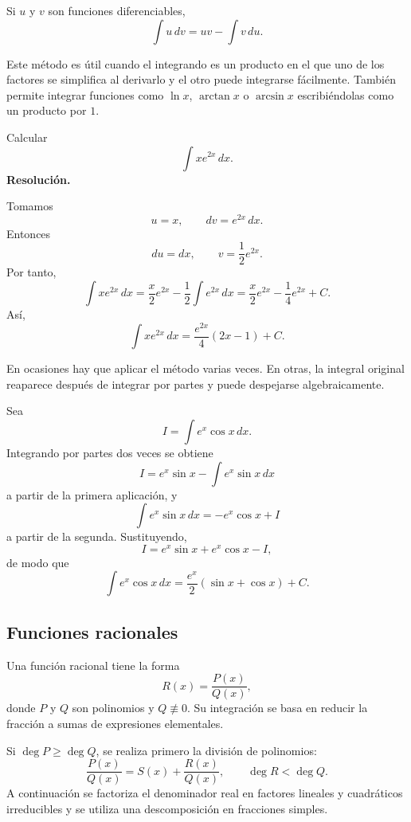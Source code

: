 \begin{theorem}
Si $u$ y $v$ son funciones diferenciables,
\[
\boxed{\int u\,dv=uv-\int v\,du.}
\]
\end{theorem}

Este método es útil cuando el integrando es un producto en el que uno de los factores se simplifica al derivarlo y el otro puede integrarse fácilmente. También permite integrar funciones como $\ln x$, $\arctan x$ o $\arcsin x$ escribiéndolas como un producto por $1$.

\begin{solvedexercise}
Calcular
\[
\int x e^{2x}\,dx.
\]
\tcblower
\textbf{Resolución.}\par\smallskip
Tomamos
\[
u=x,
\qquad dv=e^{2x}\,dx.
\]
Entonces
\[
du=dx,
\qquad v=\frac12e^{2x}.
\]
Por tanto,
\[
\int xe^{2x}\,dx
=
\frac{x}{2}e^{2x}-\frac12\int e^{2x}\,dx
=
\frac{x}{2}e^{2x}-\frac14e^{2x}+C.
\]
Así,
\[
\boxed{\int xe^{2x}\,dx=\frac{e^{2x}}4(2x-1)+C.}
\]
\end{solvedexercise}

En ocasiones hay que aplicar el método varias veces. En otras, la integral original reaparece después de integrar por partes y puede despejarse algebraicamente.

\begin{example}
Sea
\[
I=\int e^x\cos x\,dx.
\]
Integrando por partes dos veces se obtiene
\[
I=e^x\sin x-\int e^x\sin x\,dx
\]
a partir de la primera aplicación, y
\[
\int e^x\sin x\,dx=-e^x\cos x+I
\]
a partir de la segunda. Sustituyendo,
\[
I=e^x\sin x+e^x\cos x-I,
\]
de modo que
\[
\boxed{\int e^x\cos x\,dx=\frac{e^x}{2}(\sin x+\cos x)+C.}
\]
\end{example}

\subsection{Funciones racionales}

Una función racional tiene la forma
\[
R(x)=\frac{P(x)}{Q(x)},
\]
donde $P$ y $Q$ son polinomios y $Q\not\equiv0$. Su integración se basa en reducir la fracción a sumas de expresiones elementales.

Si $\deg P\geq\deg Q$, se realiza primero la división de polinomios:
\[
\frac{P(x)}{Q(x)}=S(x)+\frac{R(x)}{Q(x)},
\qquad \deg R<\deg Q.
\]
A continuación se factoriza el denominador real en factores lineales y cuadráticos irreducibles y se utiliza una descomposición en fracciones simples.

